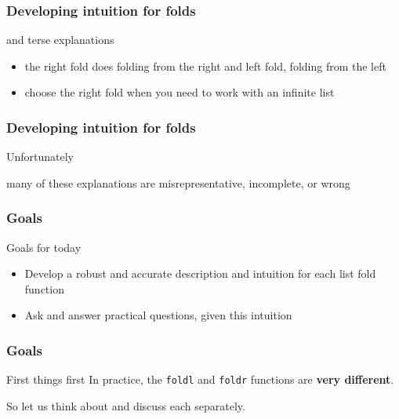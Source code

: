 \begin{frame}
\frametitle{Developing intuition for folds}
\begin{block}{and terse explanations}
\begin{itemize}
\item<1-> the right fold does folding from the right and left fold, folding from the left
\item<2-> choose the right fold when you need to work with an infinite list 
\end{itemize}
\end{block}
\end{frame}

\begin{frame}[fragile]
\frametitle{Developing intuition for folds}
\begin{block}{Unfortunately}
\begin{center}
many of these explanations are misrepresentative, incomplete, or wrong
\end{center}
\end{block}
\end{frame}

\begin{frame}
\frametitle{Goals}
\begin{block}{Goals for today}
\begin{itemize}
\item Develop a robust and accurate description and intuition for each list fold function
\item Ask and answer practical questions, given this intuition
\end{itemize}
\end{block}
\end{frame}

\begin{frame}
\frametitle{Goals}
\begin{block}{First things first}
\center
In practice, the \lstinline[basicstyle=\ttfamily]$foldl$ and \lstinline[basicstyle=\ttfamily]$foldr$ functions are \textbf{very different}.
\end{block}
So let us think about and discuss each separately.
\end{frame}

